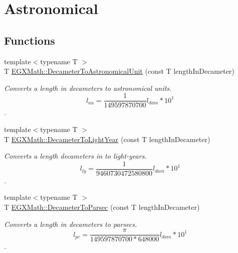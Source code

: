 \hypertarget{group___e_g_x_math-_conversions-_length_conversions-_s_i-_decameter-_astronomical}{}\section{Astronomical}
\label{group___e_g_x_math-_conversions-_length_conversions-_s_i-_decameter-_astronomical}
\subsection*{Functions}
\begin{DoxyCompactItemize}
\item 
{\footnotesize template$<$typename T $>$ }\\T \mbox{\hyperlink{group___e_g_x_math-_conversions-_length_conversions-_s_i-_decameter-_astronomical_ga04365d1ba4f6dc4e7a607d720ccd807b}{E\+G\+X\+Math\+::\+Decameter\+To\+Astronomical\+Unit}} (const T length\+In\+Decameter)
\begin{DoxyCompactList}\small\item\em Converts a length in decameters to astronomical units. \[ l_{au}= \frac{1}{149597870700} l_{dam} * 10^{1} \]. \end{DoxyCompactList}\item 
{\footnotesize template$<$typename T $>$ }\\T \mbox{\hyperlink{group___e_g_x_math-_conversions-_length_conversions-_s_i-_decameter-_astronomical_gaf31492b0cfcc0ec057856854376a2ba6}{E\+G\+X\+Math\+::\+Decameter\+To\+Light\+Year}} (const T length\+In\+Decameter)
\begin{DoxyCompactList}\small\item\em Converts a length decameters in to light-\/years. \[ l_{ly}= \frac{1}{9460730472580800} l_{dam} * 10^{1} \]. \end{DoxyCompactList}\item 
{\footnotesize template$<$typename T $>$ }\\T \mbox{\hyperlink{group___e_g_x_math-_conversions-_length_conversions-_s_i-_decameter-_astronomical_ga50cf188f39f408c283b9a696ec44cee1}{E\+G\+X\+Math\+::\+Decameter\+To\+Parsec}} (const T length\+In\+Decameter)
\begin{DoxyCompactList}\small\item\em Converts a length in decameters to parsecs. \[ l_{pc}=\frac{\pi}{149597870700 * 648000} l_{dam} * 10^{1} \]. \end{DoxyCompactList}\end{DoxyCompactItemize}



